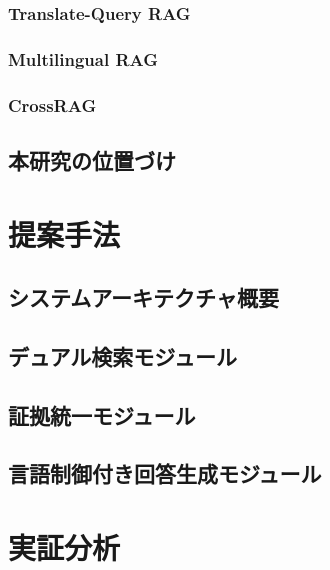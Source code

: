 \documentclass[12pt, a4paper]{jsarticle}
\begin{document}
\subsection{Translate-Query RAG}
\label{subsec:translate_query}

\subsection{Multilingual RAG}
\label{subsec:multilingual_rag}

\subsection{CrossRAG}
\label{subsec:cross_rag}

\section{本研究の位置づけ}
\label{sec:positioning}

\chapter{提案手法}
\label{chap:proposed_method}

\section{システムアーキテクチャ概要}
\label{sec:architecture_overview}

\section{デュアル検索モジュール}
\label{sec:dual_retrieval}

\section{証拠統一モジュール}
\label{sec:evidence_unification}

\section{言語制御付き回答生成モジュール}
\label{sec:controlled_generation}

\chapter{実証分析}
\label{chap:experiments}
\end{document}
